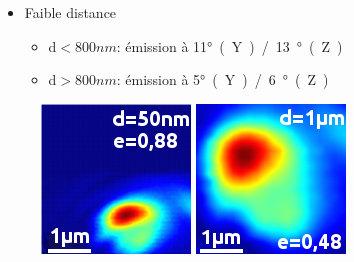 \documentclass[9pt,a9paper,handout]{beamer}
\begin{document}
\begin{frame}
        \vspace*{2mm}
        \begin{itemize} \item Faible distance
            \begin{itemize}
                \item d$<800nm$: émission à 11\si\degree (Y) / 13\si\degree (Z)
                \item d$>800nm$: émission à  5\si\degree (Y) /  6\si\degree (Z)
            \end{itemize}
        \end{itemize}
        \vspace*{-5mm}
        \begin{figure}[c]\flushright
            \includegraphics[height=0.15\textwidth]{Images/Scans/Metal_50nm}
            \quad
            \includegraphics[height=0.15\textwidth]{Images/Scans/Metal_1um}
            \quad
        \end{figure}
    \end{frame}
\end{document}
